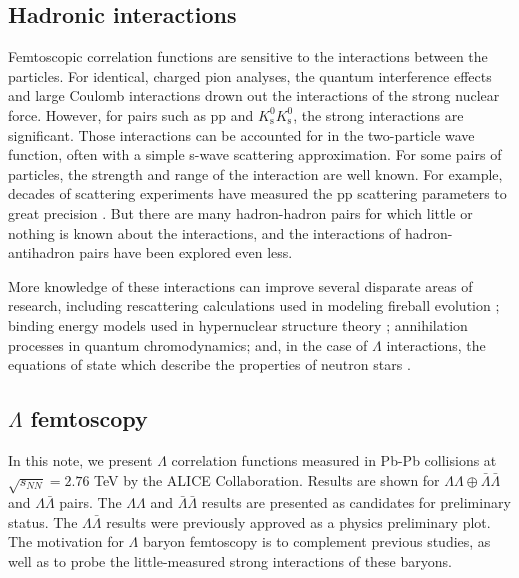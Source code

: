 \subsection{Hadronic interactions}
\label{sec:HadronicInteractions}



Femtoscopic correlation functions are sensitive to the interactions between the particles.
For identical, charged pion analyses, the quantum interference effects and large Coulomb interactions drown out the interactions of the strong nuclear force.
However, for pairs such as pp and $K^0_\mathrm{s}K^0_\mathrm{s}$, the strong interactions are significant.
Those interactions can be accounted for in the two-particle wave function, often with a simple s-wave scattering approximation.
For some pairs of particles, the strength and range of the interaction are well known. For example, decades of scattering experiments have measured the pp scattering parameters to great precision \cite{...}.
But there are many hadron-hadron pairs for which little or nothing is known about the interactions, and the interactions of hadron-antihadron pairs have been explored even less.

More knowledge of these interactions can improve several disparate areas of research, including rescattering calculations used in modeling fireball evolution \cite{Bleicher:1999xi}; binding energy models used in hypernuclear structure theory \cite{Hiyama:2002yj,Filikhin:2002wm}; annihilation processes in quantum chromodynamics; and, in the case of $\Lambda$ interactions, the equations of state which describe the properties of neutron stars \cite{SchaffnerBielich:2008kb,Wang:2010gr}.


\subsection{$\Lambda$ femtoscopy}
\label{sec:LambdaFemto}









In this note, we present $\Lambda$ correlation functions measured in Pb-Pb collisions at $\sqrt{s_{NN}}=2.76$ TeV by the ALICE Collaboration.  
Results are shown for $\Lambda\Lambda\oplus\bar{\Lambda}\bar{\Lambda}$ and $\Lambda\bar{\Lambda}$ pairs. 
The $\Lambda\Lambda$ and $\bar{\Lambda}\bar{\Lambda}$ results are presented as candidates for preliminary status. 
The $\Lambda\bar{\Lambda}$ results were previously approved as a physics preliminary plot.  
The motivation for $\Lambda$ baryon femtoscopy is to complement previous studies, as well as to probe the little-measured strong interactions of these baryons.

